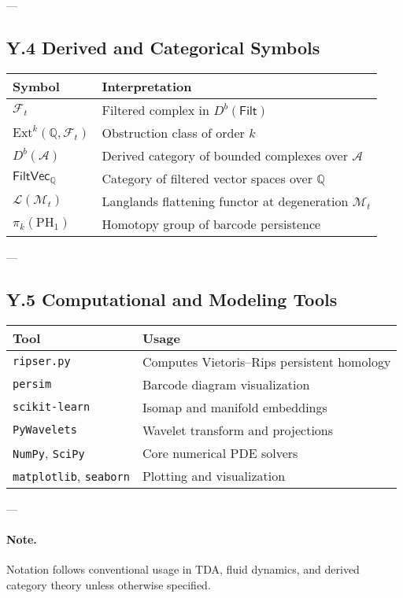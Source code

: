 \documentclass[11pt]{article}
\theoremstyle{definition}
\begin{document}
---

\subsection*{Y.4 Derived and Categorical Symbols}

\begin{tabular}{ll}
\textbf{Symbol} & \textbf{Interpretation} \\
\hline
$\mathcal{F}_t$ & Filtered complex in $D^b(\mathsf{Filt})$ \\
$\mathrm{Ext}^k(\mathbb{Q}, \mathcal{F}_t)$ & Obstruction class of order $k$ \\
$D^b(\mathcal{A})$ & Derived category of bounded complexes over $\mathcal{A}$ \\
$\mathsf{FiltVec}_\mathbb{Q}$ & Category of filtered vector spaces over $\mathbb{Q}$ \\
$\mathcal{L}(\mathcal{M}_t)$ & Langlands flattening functor at degeneration $\mathcal{M}_t$ \\
$\pi_k(\mathrm{PH}_1)$ & Homotopy group of barcode persistence \\
\end{tabular}

---

\subsection*{Y.5 Computational and Modeling Tools}

\begin{tabular}{ll}
\textbf{Tool} & \textbf{Usage} \\
\hline
\texttt{ripser.py} & Computes Vietoris–Rips persistent homology \\
\texttt{persim} & Barcode diagram visualization \\
\texttt{scikit-learn} & Isomap and manifold embeddings \\
\texttt{PyWavelets} & Wavelet transform and projections \\
\texttt{NumPy}, \texttt{SciPy} & Core numerical PDE solvers \\
\texttt{matplotlib}, \texttt{seaborn} & Plotting and visualization \\
\end{tabular}

---

\paragraph{Note.} Notation follows conventional usage in TDA, fluid dynamics, and derived category theory unless otherwise specified.
\end{document}
